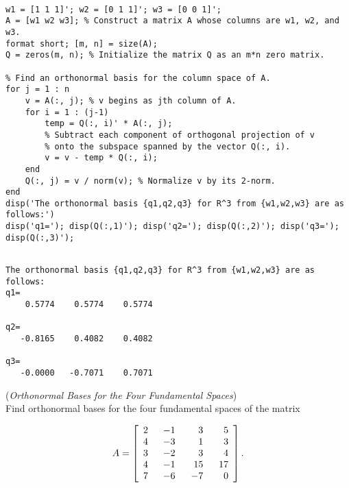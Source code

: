\begin{sol}

\begin{verbatim}

w1 = [1 1 1]'; w2 = [0 1 1]'; w3 = [0 0 1]';
A = [w1 w2 w3]; % Construct a matrix A whose columns are w1, w2, and w3.
format short; [m, n] = size(A);
Q = zeros(m, n); % Initialize the matrix Q as an m*n zero matrix.

% Find an orthonormal basis for the column space of A.
for j = 1 : n
    v = A(:, j); % v begins as jth column of A.
    for i = 1 : (j-1)
        temp = Q(:, i)' * A(:, j);
        % Subtract each component of orthogonal projection of v
        % onto the subspace spanned by the vector Q(:, i).
        v = v - temp * Q(:, i);
    end
    Q(:, j) = v / norm(v); % Normalize v by its 2-norm.
end
disp('The orthonormal basis {q1,q2,q3} for R^3 from {w1,w2,w3} are as follows:')
disp('q1='); disp(Q(:,1)'); disp('q2='); disp(Q(:,2)'); disp('q3='); disp(Q(:,3)');
\end{verbatim}

\begin{outputs}
\begin{verbatim}

The orthonormal basis {q1,q2,q3} for R^3 from {w1,w2,w3} are as follows:
q1=
    0.5774    0.5774    0.5774

q2=
   -0.8165    0.4082    0.4082

q3=
   -0.0000   -0.7071    0.7071
\end{verbatim}
\end{outputs}

\end{sol}

\vspace{3mm}
\begin{exer}\label{GS} (\textit{Orthonormal Bases for the Four Fundamental Spaces})\\
Find orthonormal bases for the four fundamental spaces of the matrix


\begin{displaymath}
A = \left[\begin{array}{rrrr} 2& \hspace{2mm} -1& \hspace{5mm} 3&\hspace{4mm} 5\\ 4 & -3 & 1 & 3 \\ 3 & -2 & 3 & 4 \\ 4 & -1 & 15 & 17 \\ 7 & -6 & -7 & 0  \end{array} \right].
\end{displaymath}
\end{exer}

